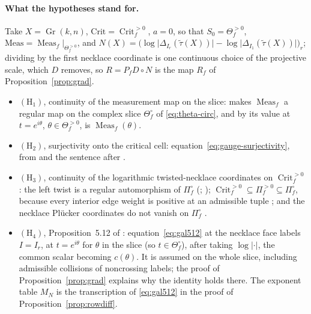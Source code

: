 \documentclass[11pt]{article}
\theoremstyle{definition}
\DeclareMathOperator{\Gr}{Gr}
\DeclareMathOperator{\Meas}{Meas}
\DeclareMathOperator{\Crit}{Crit}
\newcommand{\Thef}{\Theta_f^{>0}}
\newcommand{\Critf}{\Crit_f^{>0}}
\begin{document}
\paragraph{What the hypotheses stand for.}
Take $X=\Gr(k,n)$, $\mathrm{Crit}=\Critf$, $a=0$, so that $S_0=\Thef$, $\mathrm{Meas}=\Meas_f|_{\Thef}$,
and $N(X)=\bigl(\log\lvert\Delta_{I_r}(\widetilde\tau(X))\rvert-\log\lvert\Delta_{I_1}(\widetilde\tau(X))
\rvert\bigr)_r$; dividing by the first necklace coordinate is one continuous choice of the projective
scale, which $D$ removes, so $R=P_fD\circ N$ is the map $R_f$ of Proposition~\ref{prop:grad}.
\begin{itemize}
\item $(\mathrm H_1)$, continuity of the measurement map on the slice:
\cite[Prop.~5.1]{Galashin} makes $\Meas_f$ a regular map on the complex slice $\Theta_f^\circ$ of
\eqref{eq:theta-circ}, and by \cite[Lem.~5.13]{Galashin} its value at $t=e^{i\theta}$, $\theta\in\Thef$,
is $\Meas_f(\theta)$.
\item $(\mathrm H_2)$, surjectivity onto the critical cell: equation~\eqref{eq:gauge-surjectivity},
from \cite[Prop.~4.2 and the paragraph following it]{Galashin} and the sentence after
\cite[eq.~(4.3)]{Galashin}.
\item $(\mathrm H_3)$, continuity of the logarithmic twisted-necklace coordinates on $\Critf$: the left
twist is a regular automorphism of $\Pi_f^\circ$ (\cite{MullerSpeyer}; \cite[\S5.4]{Galashin});
$\Critf\subseteq\Pi_f^{>0}\subseteq\Pi_f^\circ$, because every interior edge weight is positive at an
admissible tuple \cite[Prop.~4.2, Def.~1.8 and eq.~(2.6)]{Galashin}; and the necklace Pl\"ucker
coordinates do not vanish on $\Pi_f^\circ$ \cite[eq.~(2.4)]{Galashin}.
\item $(\mathrm H_4)$, Proposition~5.12 of \cite{Galashin}: equation~\eqref{eq:gal512} at the necklace
face labels $I=I_r$, at $t=e^{i\theta}$ for $\theta$ in the slice (so $t\in\Theta_f^\circ$), after
taking $\log\lvert\cdot\rvert$, the common scalar becoming $c(\theta)$. It is assumed on the whole
slice, including admissible collisions of noncrossing labels; the proof of
Proposition~\ref{prop:grad} explains why the identity holds there. The exponent table $M_N$ is the
transcription of \eqref{eq:gal512} in the proof of Proposition~\ref{prop:rowdiff}.
\end{itemize}
\end{document}
